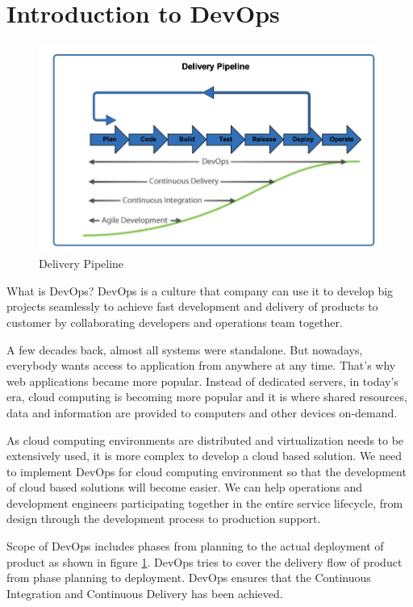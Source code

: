 \documentclass[a4paper,oneside,1,english1pt]{report}
\begin{document}
\section{Introduction to DevOps}
	\begin{figure}
		\includegraphics[width=.8\linewidth]{diagrams/all.png}
		\caption{Delivery Pipeline \cite{DeliveryPipeline}}
		\label{fig:delivery_pipeline}
	\end{figure}

	What is DevOps? DevOps is a culture that company can use it to develop big projects seamlessly to achieve fast development and delivery of products to customer by collaborating developers and operations team together.

	\par A few decades back, almost all systems were standalone. But nowadays, everybody wants access to application from anywhere at any time. That's why web applications became more popular. 
	Instead of dedicated servers, in today's era, cloud computing is becoming more popular and it is where shared resources, data and information are provided to computers and other                                devices on-demand.
	
	
	\par As cloud computing environments are distributed and virtualization needs to be extensively used, it is more complex to develop a cloud based solution.
	We need to implement DevOps for cloud computing environment so that the development of cloud based solutions will become easier. We can help operations and development engineers participating together in the entire service lifecycle, from design through the development process to production support. 
	\par Scope of DevOps includes phases from planning to the actual deployment of product as shown in figure \ref{fig:delivery_pipeline}. DevOps tries to cover the delivery flow of product from phase planning to deployment. DevOps ensures that the Continuous Integration and Continuous Delivery has been achieved.
\end{document}
